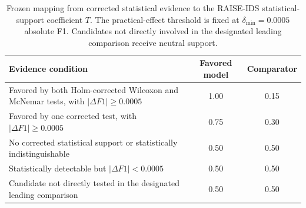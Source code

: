\begin{table}[!htbp]
\centering
\caption{Frozen mapping from corrected statistical evidence to the RAISE-IDS statistical-support coefficient $T$. The practical-effect threshold is fixed at $\delta_{\min}=0.0005$ absolute F1. Candidates not directly involved in the designated leading comparison receive neutral support.}
\label{tab:raise_ids_t_mapping}
\small
\begin{tabularx}{\textwidth}{Xcc}
\toprule
Evidence condition & Favored model & Comparator \\
\midrule
Favored by both Holm-corrected Wilcoxon and McNemar tests, with $|\Delta F1|\geq 0.0005$ & 1.00 & 0.15 \\
Favored by one corrected test, with $|\Delta F1|\geq 0.0005$ & 0.75 & 0.30 \\
No corrected statistical support or statistically indistinguishable & 0.50 & 0.50 \\
Statistically detectable but $|\Delta F1|<0.0005$ & 0.50 & 0.50 \\
Candidate not directly tested in the designated leading comparison & 0.50 & 0.50 \\
\bottomrule
\end{tabularx}
\end{table}
